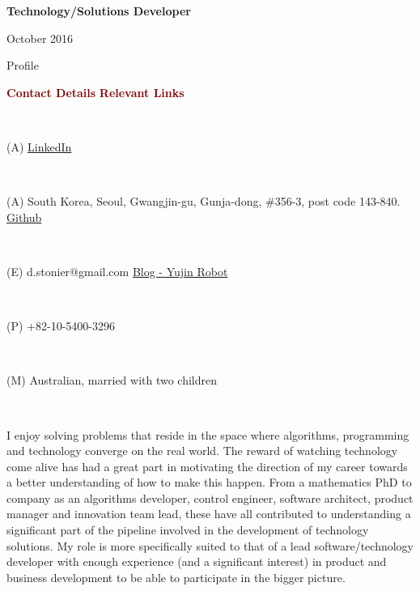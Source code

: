 \documentclass[a4paper,10pt]{article}
\begin{document}

\vspace{-2.5em}

\begin{center}
  \textbf{Technology/Solutions Developer} \\
  \begin{small} October 2016 \end{small}
\end{center}


\vspace{-2.5em}

\begin{cvsection}{Profile}

\vspace{-2em}

\kofamily

\begin{small} \textcolor{maroon}{\textbf{Contact Details}} \hfill \textcolor{maroon}{\textbf{Relevant Links}} \end{small}  \\ 
\begin{small} (A)  \hfill \href{http://kr.linkedin.com/pub/daniel-stonier/22/375/95b}{LinkedIn}  \end{small}  \\ 
\begin{small} (A) South Korea, Seoul, Gwangjin-gu, Gunja-dong, \#356-3, post code 143-840. \hfill \href{https://github.com/stonier}{Github} \end{small} \\  
\begin{small} (E) d.stonier@gmail.com \hfill \href{http://blog.yujinrobot.com/}{Blog - Yujin Robot} \end{small} \\
\begin{small} (P) +82-10-5400-3296 \hfill \end{small} \\
\begin{small} (M) Australian, married with two children \hfill \end{small} \\

\rmfamily

  \vspace{-1.5em}

  I enjoy solving problems that reside in the space where algorithms, programming and technology converge on the real world. The reward of watching technology come alive has had a great part in motivating the direction of my career towards a better understanding of how to make this happen. From a mathematics PhD to company as an algorithms developer, control engineer, software architect, product manager and innovation team lead, these have all contributed to understanding a significant part of the pipeline involved in the development of technology solutions. My role is more specifically suited to that of a lead software/technology developer with enough experience (and a significant interest) in product and business development to be able to participate in the bigger picture.
  

\end{cvsection}
\end{document}
